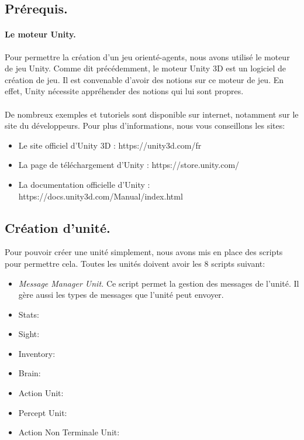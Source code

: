 \documentclass{report}
\begin{document}
\subsection{Prérequis.}
\paragraph{Le moteur Unity.}Pour permettre la création d'un jeu orienté-agents, nous avons utilisé le moteur de jeu Unity. Comme dit précédemment, le moteur Unity 3D est un logiciel de création de jeu. Il est convenable d'avoir des notions sur ce moteur de jeu. En effet, Unity nécessite appréhender des notions qui lui sont propres.
\paragraph{}De nombreux exemples et tutoriels sont disponible sur internet, notamment sur le site du développeurs. Pour plus d'informations, nous vous conseillons les sites:
\begin{itemize}
\item Le site officiel d'Unity 3D : https://unity3d.com/fr
\item La page de téléchargement d'Unity : https://store.unity.com/
\item La documentation officielle d'Unity : https://docs.unity3d.com/Manual/index.html
\end{itemize}


\subsection{Création d'unité.}
Pour pouvoir créer une unité simplement, nous avons mis en place des scripts pour permettre cela.
Toutes les unités doivent avoir les 8 scripts suivant:

\begin{itemize}
\item \textit{Message Manager Unit.}\newline
Ce script permet la gestion des messages de l'unité. Il gère aussi les types de messages que l'unité peut envoyer. 
\item Stats:
\item Sight:
\item Inventory:
\item Brain:
\item Action Unit:
\item Percept Unit:
\item Action Non Terminale Unit:
\end{itemize}
\end{document}

